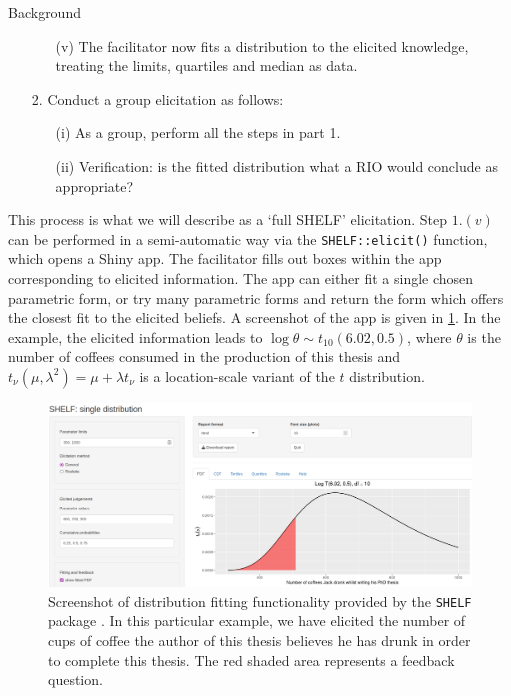 \begin{chapter}{Background \label{Ch:background}}
\begin{itemize}
\begin{itemize}
    \item[(v)] The facilitator now fits a distribution to the elicited knowledge, treating the limits, quartiles and median as data.
  \end{itemize}
\item[2.] {Conduct a group elicitation as follows:}
  \begin{itemize}
    \item[(i)] As a group, perform all the steps in part 1.
    \item[(ii)] Verification: is the fitted distribution what a RIO would conclude as appropriate?
  \end{itemize}
\end{itemize}
This process is what we will describe as a `full SHELF' elicitation. Step $1. (v)$ can be performed in a semi-automatic way via the \texttt{SHELF::elicit()} function, which opens a Shiny app. The facilitator fills out boxes within the app corresponding to elicited information. The app can either fit a single chosen parametric form, or try many parametric forms and return the form which offers the closest fit to the elicited beliefs. A screenshot of the app is given  in \cref{Fig:shelf-app}. In the example, the elicited information leads to $\log \theta \sim t_{10}(6.02, 0.5)$, where $\theta$ is the number of coffees consumed in the production of this thesis and $t_\nu (\mu, \lambda^2) = \mu + \lambda t_\nu$ is a location-scale variant of the $t$ distribution.
\begin{figure}
  \centering
  \includegraphics[width=\textwidth]{fig-background/shiny.png}
  \caption{Screenshot of distribution fitting functionality provided by the \texttt{SHELF} package \citep{SHELFpkg}. In this particular example, we have elicited the number of cups of coffee the author of this thesis believes he has drunk in order to complete this thesis. The red shaded area represents a feedback question.\label{Fig:shelf-app}}
\end{figure}

\end{chapter}
